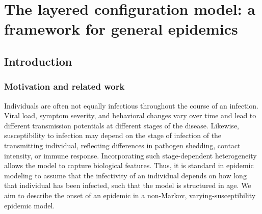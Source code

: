 \section{The layered configuration model: a framework for general epidemics}
\subsection{Introduction}
\subsubsection{Motivation and related work}
Individuals are often not equally infectious throughout the course of
an infection. Viral load, symptom severity, and behavioral changes
vary over time and lead to different transmission potentials at
different stages of the disease. Likewise, susceptibility to infection
may depend on the stage of infection of the transmitting individual,
reflecting differences in pathogen shedding, contact intensity, or
immune response. Incorporating such stage-dependent heterogeneity
allows the model to capture biological features. Thus, it is standard
in epidemic modeling to assume that the infectivity of an individual
depends on how long that individual has been infected, such that the
model is structured in age. We aim to describe the onset of an
epidemic in a non-Markov, varying-susceptibility epidemic model.
 
